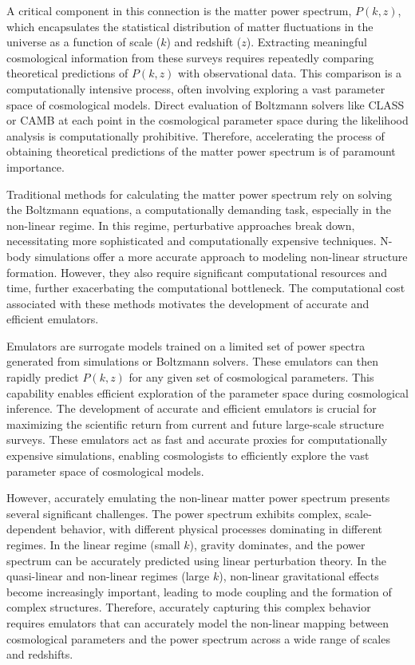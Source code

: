 \documentclass[twocolumn]{aastex631}
\begin{document}
\noindent A critical component in this connection is the matter power spectrum, \(P(k, z)\), which encapsulates the statistical distribution of matter fluctuations in the universe as a function of scale (\(k\)) and redshift (\(z\)). Extracting meaningful cosmological information from these surveys requires repeatedly comparing theoretical predictions of \(P(k, z)\) with observational data. This comparison is a computationally intensive process, often involving exploring a vast parameter space of cosmological models. Direct evaluation of Boltzmann solvers like CLASS or CAMB at each point in the cosmological parameter space during the likelihood analysis is computationally prohibitive. Therefore, accelerating the process of obtaining theoretical predictions of the matter power spectrum is of paramount importance.

\noindent Traditional methods for calculating the matter power spectrum rely on solving the Boltzmann equations, a computationally demanding task, especially in the non-linear regime. In this regime, perturbative approaches break down, necessitating more sophisticated and computationally expensive techniques. N-body simulations offer a more accurate approach to modeling non-linear structure formation. However, they also require significant computational resources and time, further exacerbating the computational bottleneck. The computational cost associated with these methods motivates the development of accurate and efficient emulators.

\noindent Emulators are surrogate models trained on a limited set of power spectra generated from simulations or Boltzmann solvers. These emulators can then rapidly predict \(P(k, z)\) for any given set of cosmological parameters. This capability enables efficient exploration of the parameter space during cosmological inference. The development of accurate and efficient emulators is crucial for maximizing the scientific return from current and future large-scale structure surveys. These emulators act as fast and accurate proxies for computationally expensive simulations, enabling cosmologists to efficiently explore the vast parameter space of cosmological models.

\noindent However, accurately emulating the non-linear matter power spectrum presents several significant challenges. The power spectrum exhibits complex, scale-dependent behavior, with different physical processes dominating in different regimes. In the linear regime (small \(k\)), gravity dominates, and the power spectrum can be accurately predicted using linear perturbation theory. In the quasi-linear and non-linear regimes (large \(k\)), non-linear gravitational effects become increasingly important, leading to mode coupling and the formation of complex structures. Therefore, accurately capturing this complex behavior requires emulators that can accurately model the non-linear mapping between cosmological parameters and the power spectrum across a wide range of scales and redshifts.
\end{document}
